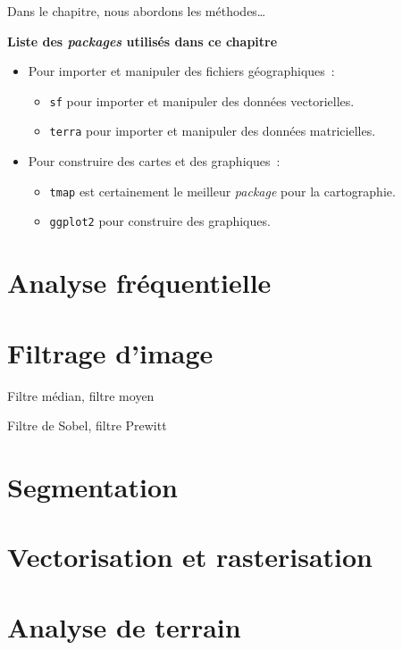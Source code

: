 \documentclass[
  letterpaper,
  DIV=11,
  numbers=noendperiod]{scrreprt}
\providecommand{\tightlist}{%
  \setlength{\itemsep}{0pt}\setlength{\parskip}{0pt}}\usepackage{longtable,booktabs,array}
\begin{document}
Dans le chapitre, nous abordons les méthodes\ldots{}

\textbf{Liste des \emph{packages} utilisés dans ce chapitre}

\begin{itemize}
\tightlist
\item
  Pour importer et manipuler des fichiers géographiques~:

  \begin{itemize}
  \tightlist
  \item
    \texttt{sf} pour importer et manipuler des données vectorielles.
  \item
    \texttt{terra} pour importer et manipuler des données matricielles.
  \end{itemize}
\item
  Pour construire des cartes et des graphiques~:

  \begin{itemize}
  \tightlist
  \item
    \texttt{tmap} est certainement le meilleur \emph{package} pour la
    cartographie.
  \item
    \texttt{ggplot2} pour construire des graphiques.
  \end{itemize}
\end{itemize}

\section{Analyse fréquentielle}\label{sec-041}

\section{Filtrage d'image}\label{sec-042}

Filtre médian, filtre moyen

Filtre de Sobel, filtre Prewitt

\section{Segmentation}\label{sec-043}

\section{Vectorisation et rasterisation}\label{sec-044}

\section{Analyse de terrain}\label{sec-045}
\end{document}
